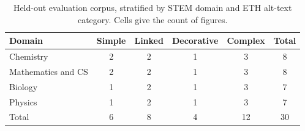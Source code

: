 \setlength{\heavyrulewidth}{1.0pt}
\setlength{\lightrulewidth}{0.5pt}
\setlength{\arrayrulewidth}{0.5pt}
\setlength{\aboverulesep}{0pt}
\setlength{\belowrulesep}{0pt}
\begin{table}[htbp]
\centering
\caption{Held-out evaluation corpus, stratified by STEM domain and ETH alt-text category. Cells give the count of figures.}
\label{tab:corpus}
\begin{tabular}{lccccc}
\toprule
Domain & Simple & Linked & Decorative & Complex & Total \\
\midrule
Chemistry & 2 & 2 & 1 & 3 & 8 \\
Mathematics and CS & 2 & 2 & 1 & 3 & 8 \\
Biology & 1 & 2 & 1 & 3 & 7 \\
Physics & 1 & 2 & 1 & 3 & 7 \\
Total & 6 & 8 & 4 & 12 & 30 \\
\bottomrule
\end{tabular}
\end{table}
